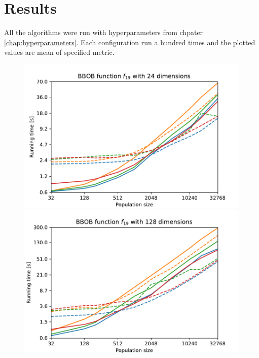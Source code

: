 \chapter{Results}

All the algorithms were run with hyperparameters from chpater \ref{chap:hyperparameters}. Each configuration run a hundred times and the plotted values are mean of specified metric.




\begin{figure}[ht!]
    \begin{minipage}[t]{0.32\textwidth}
        \centering
        \includegraphics[width=\textwidth]{img/runs/time_es_mutation_fn19_24d.pdf}
    \end{minipage}
    \hfill
    \begin{minipage}[t]{0.32\textwidth}
        \centering
        \includegraphics[width=\textwidth]{img/runs/time_es_mutation_fn19_128d.pdf}

\end{minipage}
\end{figure}
